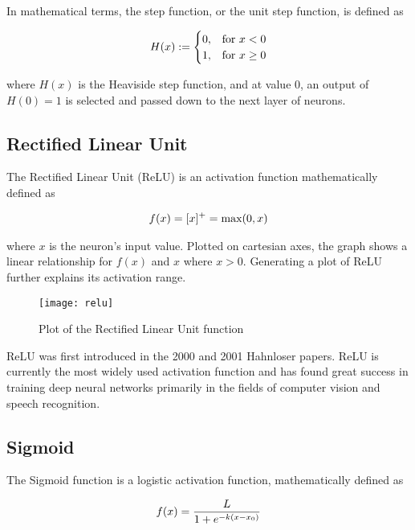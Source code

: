 In mathematical terms, the step function, or the unit step function, is defined as

\begin{align}
    \centering
    H(x) := \begin{cases}
        0, & \text{for } x < 0 \\
        1, & \text{for } x \geq 0
    \end{cases}
\end{align}

where $H(x)$ is the Heaviside step function\cite{step_function}, and at value 0, an output of $H(0) = 1$ is selected and passed down to the next layer of neurons.

\subsection{Rectified Linear Unit}
The Rectified Linear Unit (ReLU) is an activation function mathematically defined as 

\begin{align}
    \centering
    f(x) = [x]^+ = \text{max}(0, x) 
\end{align}

where $x$ is the neuron's input value. Plotted on cartesian axes, the graph shows a linear relationship for $f(x)$ and $x$ where $x > 0$. Generating a plot of ReLU further explains its activation range.

\begin{figure}[H]
    \centering
    \texttt{[image: relu]}
    \caption{Plot of the Rectified Linear Unit function}
    \label{tab:relu}
\end{figure}

ReLU was first introduced in the 2000 and 2001 Hahnloser papers\cite{relu}. ReLU is currently the most widely used activation function\cite{acti-functions} and has found great success in training deep neural networks primarily in the fields of computer vision\cite{relu-vision} and speech recognition\cite{relu-acoustics}.

\subsection{Sigmoid}
The Sigmoid function is a logistic activation function, mathematically defined as 

\begin{align}
    \centering
    f(x) = \frac{L}{1 + e^{-k(x-x_0)}}
\end{align}

